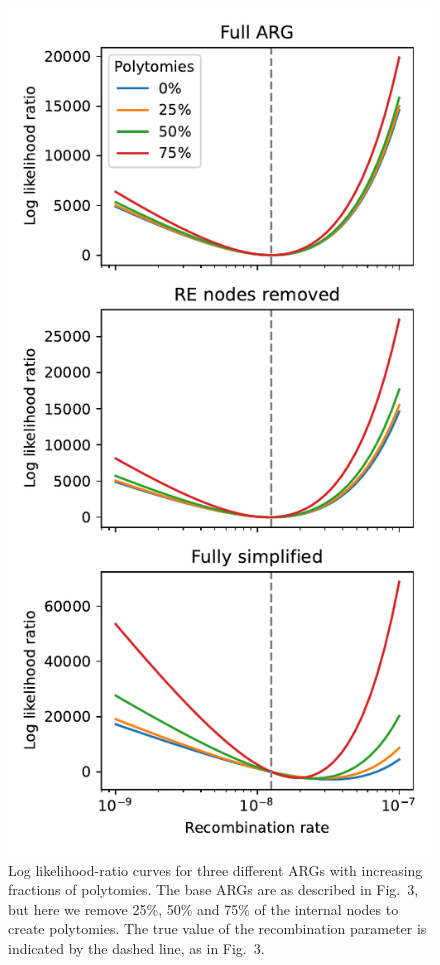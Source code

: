 \documentclass{article}
\begin{document}
\setcounter{table}{0}
\setcounter{figure}{0}
\renewcommand{\thetable}{S\arabic{table}}
\renewcommand{\thefigure}{S\arabic{figure}}

\begin{figure}[!ht]
\centering
\includegraphics{figures/likelihood_surface_suppl}
    \caption{Log likelihood-ratio curves for three different ARGs 
    with increasing fractions of polytomies.
    The base ARGs are as described in Fig.~3, but here we remove 
    25\%, 50\% and 75\% of the internal nodes to create polytomies.
    The true value of the recombination parameter is indicated by the 
    dashed line, as in Fig.~3.
    \label{fig:likelihood_suppl}}
\end{figure}
\end{document}
